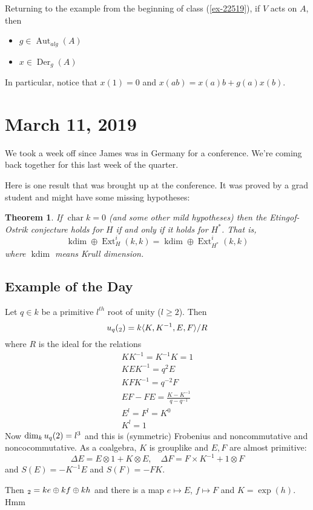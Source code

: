 \documentclass[12pt]{article}
\theoremstyle{break}
\theoremstyle{nonumberbreak}
\theoremstyle{changebreak}
\newtheorem{thm}{Theorem}[subsection]
\theoremstyle{break}
\theoremstyle{nonumberbreak}
\theoremstyle{nonumberplain}
\theoremstyle{change}
\DeclareMathOperator{\Aut}{Aut}
\DeclareMathOperator{\Ext}{Ext}
\DeclareMathOperator{\ch}{char}
\DeclareMathOperator{\Der}{Der}
\begin{document}
Returning to the example from the beginning of class (\ref{ex-22519}), if $V$ acts on $A$,
then 
\begin{itemize}
	\item $g\in \Aut_{alg}(A)$
	\item $x\in\Der_g(A)$
\end{itemize}
In particular, notice that $x(1)=0$ and $x(ab)=x(a)b+g(a)x(b)$.

\section{March 11, 2019}
We took a week off since James was in Germany for a conference. We're coming back together for this
last week of the quarter.

Here is one result that was brought up at the conference. It was proved by a grad student and might 
have some missing hypotheses:
\begin{thm}
	If $\ch k=0$ (and some other mild hypotheses) then the Etingof-Ostrik conjecture holds for $H$ 
	if and only if it holds for $H^*$. That is,
	\[\operatorname{kdim}\oplus \Ext_H^i(k,k)=\operatorname{kdim}\oplus \Ext^i_{H^*}(k,k)\]
	where $\operatorname{kdim}$ means Krull dimension.
\end{thm}

\subsection{Example of the Day}
\begin{ex}
	Let $q\in k$ be a primitive $l^{th}$ root of unity ($l\ge 2$). Then
	\[u_q(\sl_2)=k\langle K,K^{-1},E,F\rangle/R\]
	where $R$ is the ideal for the relations
	\begin{align*}
		KK^{-1}=K^{-1}K=1\\
		KEK^{-1}=q^2E\\
		KFK^{-1}=q^{-2}F\\
		EF-FE=\frac{K-K^{-1}}{q-q^{-1}}\\
		E^l=F^l=K^0\\
		K^l=1
	\end{align*}
	Now $\dim_k u_q(\sl2)=l^3$ and this is (symmetric) Frobenius and noncommutative and noncocommutative.
	As a coalgebra, $K$ is grouplike and $E,F$ are almost primitive:
	\[\Delta E=E\otimes 1+K\otimes E,\quad \Delta F = F\times K^{-1}+1\otimes F\]
	and $S(E)=-K^{-1}E$ and $S(F)=-FK$.

	Then $\sl_2=ke\oplus kf\oplus kh$ and there is a map $e\mapsto E$, $f\mapsto F$ and $K=\exp(h)$. Hmm
\end{ex}
\end{document}
